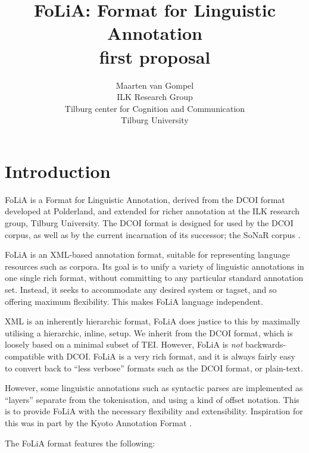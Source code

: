 \documentclass[a4paper,12pt]{report}
\title{FoLiA: Format for Linguistic Annotation \\ \small first proposal}
\author{Maarten van Gompel \\ ILK Research Group \\ Tilburg center for Cognition and Communication \\ Tilburg University }
\begin{document}
\sffamily

\maketitle
\tableofcontents


\chapter{Introduction}

FoLiA is a Format for Linguistic Annotation, derived from the DCOI format\cite{DCOI} developed at Polderland, and extended for richer annotation at the ILK research group, Tilburg University. The DCOI format is designed for used by the DCOI corpus, as well as by the current incarnation of its successor; the SoNaR corpus \cite{Oostdijk+08}. 

FoLiA is an XML-based annotation format, suitable for representing language resources such as corpora. Its goal is to unify a variety of linguistic annotations in one single rich format, without committing to any particular standard annotation set. Instead, it seeks to accommodate any desired system or tagset, and so offering maximum flexibility. This makes FoLiA language independent.


XML is an inherently hierarchic format, FoLiA does justice to this by maximally utilising a hierarchic, inline, setup. We inherit from the DCOI format, which is loosely based on a minimal subset of TEI. However, FoLiA is \emph{not} backwards-compatible with DCOI. FoLiA is a very rich format, and it is always fairly easy to convert back to ``less verbose'' formats such as the DCOI format, or plain-text. 

However, some linguistic annotations such as syntactic parses are implemented as ``layers'' separate from the tokenisation, and using a kind of offset notation. This is to provide FoLiA with the necessary flexibility and extensibility. Inspiration for this was in part by the Kyoto Annotation Format \cite{KYOTO}. 


The FoLiA format features the following:
\end{document}
